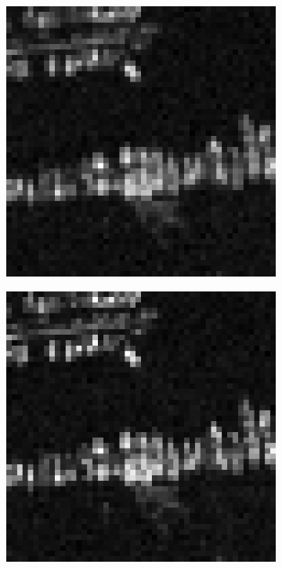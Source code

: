 \begin{figure}[t]
\begin{subfigure}{0.2\textwidth}
\end{subfigure}%
\begin{subfigure}{0.2\textwidth}
\includegraphics[width=\textwidth]{img/aliasedImg2L2}
\end{subfigure}%
\begin{subfigure}{0.2\textwidth}
\includegraphics[width=\textwidth]{img/aliasedImg2L3}

\end{subfigure}
\end{figure}
